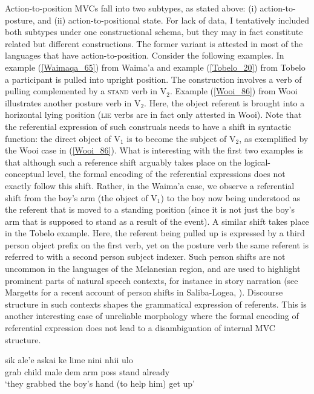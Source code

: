 Action-to-position MVCs fall into two subtypes, as stated above: (i) action-to-posture, and (ii) action-to-positional state. For lack of data, I tentatively included both subtypes under one constructional schema, but they may in fact constitute related but different constructions. The former variant is attested in most of the languages that have action-to-position. Consider the following examples. In example (\ref{Waimaqa_65}) from Waima'a and example (\ref{Tobelo_20}) from Tobelo a participant is pulled into upright position. The construction involves a verb of pulling complemented by a \textsc{stand} verb in V$_2$. Example (\ref{Wooi_86}) from Wooi illustrates another posture verb in V$_2$. Here, the object referent is brought into a horizontal lying position (\textsc{lie} verbs are in fact only attested in Wooi). Note that the referential expression of such construals needs to have a shift in syntactic function: the direct object of V$_1$ is to become the subject of V$_2$, as exemplified by the Wooi case in (\ref{Wooi_86}). What is interesting with the first two examples is that although such a reference shift arguably takes place on the logical-conceptual level, the formal encoding of the referential expressions does not exactly follow this shift. Rather, in the Waima'a case, we observe a referential shift from the boy's arm (the object of V$_1$) to the boy now being understood as the referent that is moved to a standing position (since it is not just the boy's arm that is supposed to stand as a result of the event). A similar shift takes place in the Tobelo example. Here, the referent being pulled up is expressed by a third person object prefix on the first verb, yet on the posture verb the same referent is referred to with a second person subject indexer. Such person shifts are not uncommon in the languages of the Melanesian region, and are used to highlight prominent parts of natural speech contexts, for instance in story narration (see Margetts for a recent account of person shifts in Saliba-Logea, \cite{margetts2015person}). Discourse structure in such contexts shapes the grammatical expression of referents. This is another interesting case of unreliable morphology where the formal encoding of referential expression does not lead to a disambiguation of internal MVC structure.

\ea \label{Waimaqa_65}
\gll sik ale'e askai ke lime nini nhii ulo \\
grab child male \acs{dem} arm \acs{poss} stand already \\
\glft `they grabbed the boy's hand (to help him) get
up' \\ 
\z
\xe

